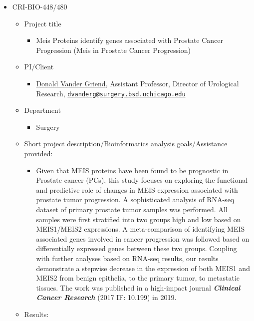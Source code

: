 \documentclass[]{article}
\providecommand{\tightlist}{%
  \setlength{\itemsep}{0pt}\setlength{\parskip}{0pt}}
\begin{document}
\begin{itemize}
\tightlist
\item
  CRI-BIO-448/480

  \begin{itemize}
  \tightlist
  \item
    Project title

    \begin{itemize}
    \tightlist
    \item
      Meis Proteins identify genes associated with Prostate Cancer
      Progression (Meis in Prostate Cancer Progression)
    \end{itemize}
  \item
    PI/Client

    \begin{itemize}
    \tightlist
    \item
      \href{https://pathology.uic.edu/directory/donald-j-vander-griend-phd/}{Donald
      Vander Griend}, Assistant Professor, Director of Urological
      Research,
      \href{mailto:dvanderg@surgery.bsd.uchicago.edu}{\nolinkurl{dvanderg@surgery.bsd.uchicago.edu}}
    \end{itemize}
  \item
    Department

    \begin{itemize}
    \tightlist
    \item
      Surgery
    \end{itemize}
  \item
    Short project description/Bioinformatics analysis goals/Assistance
    provided:

    \begin{itemize}
    \tightlist
    \item
      Given that MEIS proteins have been found to be prognostic in
      Prostate cancer (PCs), this study focuses on exploring the
      functional and predictive role of changes in MEIS expression
      associated with prostate tumor progression. A sophisticated
      analysis of RNA-seq dataset of primary prostate tumor samples was
      performed. All samples were first stratified into two groups high
      and low based on MEIS1/MEIS2 expressions. A meta-comparison of
      identifying MEIS associated genes involved in cancer progression
      was followed based on differentially expressed genes between these
      two groups. Coupling with further analyses based on RNA-seq
      results, our results demonstrate a stepwise decrease in the
      expression of both MEIS1 and MEIS2 from benign epithelia, to the
      primary tumor, to metastatic tissues. The work was published in a
      high-impact journal \textbf{\emph{Clinical Cancer Research}} (2017
      IF: 10.199) in 2019.
    \end{itemize}
  \item
    Results:


\end{itemize}
\end{itemize}
\end{document}
